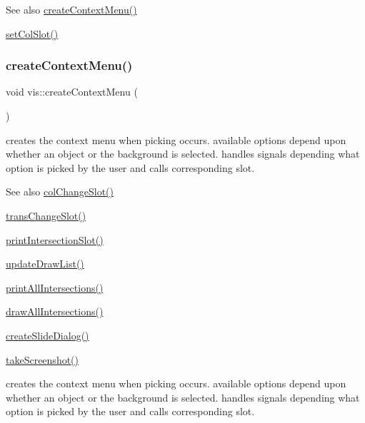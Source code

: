 \begin{DoxySeeAlso}{See also}
\mbox{\hyperlink{classvis_a63af66f730f0f06f36d255bcc7a7a244}{create\+Context\+Menu()}} 

\mbox{\hyperlink{classvis_a2338a54dfa9091ea6b050b814dc2b679}{set\+Col\+Slot()}} 
\end{DoxySeeAlso}
\mbox{\label{classvis_a63af66f730f0f06f36d255bcc7a7a244}} 
\subsubsection{\texorpdfstring{create\+Context\+Menu()}{createContextMenu()}}
{\footnotesize\ttfamily void vis\+::create\+Context\+Menu (\begin{DoxyParamCaption}{ }\end{DoxyParamCaption})}

creates the context menu when picking occurs. available options depend upon whether an object or the background is selected. handles signals depending what option is picked by the user and calls corresponding slot.

\begin{DoxySeeAlso}{See also}
\mbox{\hyperlink{classvis_ad217326086a9f0cfc1e35df9c7ccf9c0}{col\+Change\+Slot()}} 

\mbox{\hyperlink{classvis_af2c43f4aaebe6ee5047e8eb9e9e8eedd}{trans\+Change\+Slot()}} 

\mbox{\hyperlink{classvis_a192e67455047ca991fb29fbd4074c11d}{print\+Intersection\+Slot()}} 

\mbox{\hyperlink{classvis_afd17774826a24e88c4f2eae14d85c7b4}{update\+Draw\+List()}} 

\mbox{\hyperlink{classvis_af09e2926e8e8dfa0eca3d6b2f3946fdd}{print\+All\+Intersections()}} 

\mbox{\hyperlink{classvis_aca0a94b8f2256122fc6e004a4d7de6e6}{draw\+All\+Intersections()}} 

\mbox{\hyperlink{classvis_a09be90ab62dec1dcf2a72690d254acfb}{create\+Slide\+Dialog()}} 

\mbox{\hyperlink{classvis_aa44c7eaf89bd4bc5dbcd75d4e2458ec7}{take\+Screenshot()}}
\end{DoxySeeAlso}
creates the context menu when picking occurs. available options depend upon whether an object or the background is selected. handles signals depending what option is picked by the user and calls corresponding slot.

